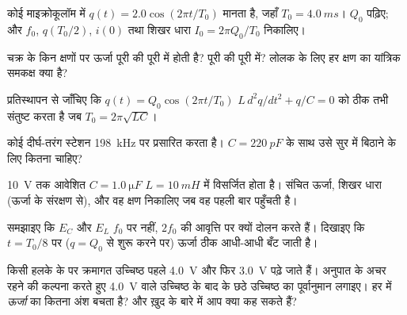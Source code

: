 \begin{exercise}[$\star$]\label{exo:g12:rlc-oscillations:4}
कोई  माइक्रोकूलॉम में $q(t) = 2.0\cos(2\pi t/T_0)$ मानता है, जहाँ $T_0 = \qty{4.0}{ms}$। $Q_0$
पढ़िए; और $f_0$, $q(T_0/2)$, $i(0)$ तथा शिखर धारा $I_0 = 2\pi Q_0/T_0$ निकालिए।
\end{exercise}

\begin{exercise}[$\star$]\label{exo:g12:rlc-oscillations:5}
चक्र के किन क्षणों पर ऊर्जा पूरी की पूरी  में होती
है? पूरी की पूरी  में? लोलक के लिए हर क्षण का यांत्रिक समकक्ष
क्या है?
\end{exercise}

\begin{exercise}[$\star\star$]\label{exo:g12:rlc-oscillations:6}
प्रतिस्थापन से जाँचिए कि $q(t) = Q_0\cos(2\pi t/T_0)$ $L\,d^2q/dt^2 + q/C = 0$ को ठीक तभी संतुष्ट करता है जब $T_0 = 2\pi\sqrt{LC}$।
\end{exercise}

\begin{exercise}[$\star\star$]\label{exo:g12:rlc-oscillations:7}
कोई दीर्घ-तरंग स्टेशन \qty{198}{kHz} पर प्रसारित करता है। $C = \qty{220}{pF}$ के साथ
उसे सुर में बिठाने के लिए कितना  चाहिए?
\end{exercise}

\begin{exercise}[$\star\star$]\label{exo:g12:rlc-oscillations:8}
\qty{10}{V} तक आवेशित $C = \qty{1.0}{\micro F}$ $L = \qty{10}{mH}$ में विसर्जित होता है। संचित ऊर्जा,
शिखर धारा (ऊर्जा के संरक्षण से), और वह क्षण निकालिए जब वह पहली बार
पहुँचती है।
\end{exercise}

\begin{exercise}[$\star\star$]\label{exo:g12:rlc-oscillations:9}
समझाइए कि $E_C$ और $E_L$ $f_0$ पर नहीं, $2f_0$ की आवृत्ति पर
क्यों दोलन करते हैं। दिखाइए कि $t = T_0/8$ पर ($q = Q_0$ से शुरू करने पर)
ऊर्जा ठीक आधी-आधी बँट जाती है।
\end{exercise}

\begin{exercise}[$\star\star$]\label{exo:g12:rlc-oscillations:10}
किसी हलके   के  पर क्रमागत
उच्चिष्ठ पहले \qty{4.0}{V} और फिर \qty{3.0}{V} पढ़े जाते हैं। अनुपात के अचर रहने की
कल्पना करते हुए \qty{4.0}{V} वाले उच्चिष्ठ के बाद के छठे उच्चिष्ठ का पूर्वानुमान
लगाइए। हर  में \emph{ऊर्जा} का कितना अंश बचता
है? और  ख़ुद के बारे में आप क्या कह सकते हैं?
\end{exercise}

